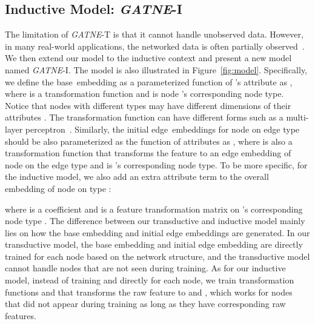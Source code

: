\documentclass[sigconf]{acmart}
\newcommand{\model}{{\em GATNE}}
\newcommand{\bi}{base}
\newcommand{\gij}{edge}
\newcommand{\hide}[1]{} \newcommand{\jie}[1]{\textbf{\color{red}[(JT: #1 )]}}  \newcommand{\vpara}[1]{\vspace{0.07in}\noindent\textbf{#1 }}
\begin{document}
\subsection{Inductive Model: \model-I}
The limitation of \model-T is that it cannot handle unobserved data. 
However, in many real-world applications, the networked data is often partially observed~\cite{yang2016revisiting}.
We then extend our model to the inductive context and present a new model named \model-I. The model is also illustrated in Figure~\ref{fig:model}. 
Specifically, we define the \bi\ embedding  as a parameterized function of 's attribute  as , where  is a transformation function\hide{ that transforms  to \bi\ embedding } and  is node 's corresponding node type. Notice that nodes with different types may have different dimensions of their attributes . The transformation function  can have different forms such as a multi-layer perceptron~\cite{pal1992multilayer}.
Similarly, the initial \gij\ embeddings  for node  on edge type  should be also parameterized as the function of attributes  as , where  is also a transformation function that transforms the feature to an edge embedding of node  on the edge type  and  is 's corresponding node type. To be more specific, for the inductive model, we also add an extra attribute term to the overall embedding of node  on type : 


\noindent where  is a coefficient and  is a feature transformation matrix on 's corresponding node type . \hide{Each node  corresponds to a certain node type  and corresponds to a feature transformation matrix .} The difference between our transductive and inductive model mainly lies on how the base embedding  and initial edge embeddings  are generated. In our transductive model, the base embedding  and initial edge embedding  are directly trained for each node based on the network structure, and the transductive model cannot handle nodes that are not seen during training. As for our inductive model, instead of training  and  directly for each node, we train transformation functions  and  that transforms the raw feature  to  and , which works for nodes that did not appear during training as long as they have corresponding raw features. \hide{For further discussion of the inductive model see Appendix \ref{extension}.}
\end{document}
